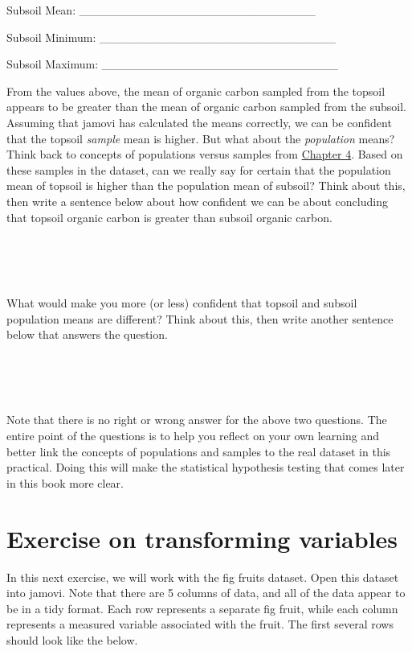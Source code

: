\documentclass[
]{scrbook}
\begin{document}
Subsoil Mean: \_\_\_\_\_\_\_\_\_\_\_\_\_\_\_\_\_\_\_\_\_\_\_\_\_\_\_\_

Subsoil Minimum: \_\_\_\_\_\_\_\_\_\_\_\_\_\_\_\_\_\_\_\_\_\_\_\_\_\_\_\_

Subsoil Maximum: \_\_\_\_\_\_\_\_\_\_\_\_\_\_\_\_\_\_\_\_\_\_\_\_\_\_\_\_

From the values above, the mean of organic carbon sampled from the topsoil appears to be greater than the mean of organic carbon sampled from the subsoil.
Assuming that jamovi has calculated the means correctly, we can be confident that the topsoil \emph{sample} mean is higher.
But what about the \emph{population} means?
Think back to concepts of populations versus samples from \protect\hyperlink{Chapter_4}{Chapter 4}.
Based on these samples in the dataset, can we really say for certain that the population mean of topsoil is higher than the population mean of subsoil?
Think about this, then write a sentence below about how confident we can be about concluding that topsoil organic carbon is greater than subsoil organic carbon.

\begin{verbatim}




\end{verbatim}

What would make you more (or less) confident that topsoil and subsoil population means are different?
Think about this, then write another sentence below that answers the question.

\begin{verbatim}




\end{verbatim}

Note that there is no right or wrong answer for the above two questions.
The entire point of the questions is to help you reflect on your own learning and better link the concepts of populations and samples to the real dataset in this practical.
Doing this will make the statistical hypothesis testing that comes later in this book more clear.

\hypertarget{transforming_variables_02}{%
\section{Exercise on transforming variables}\label{transforming_variables_02}}

In this next exercise, we will work with the fig fruits dataset.
Open this dataset into jamovi.
Note that there are 5 columns of data, and all of the data appear to be in a tidy format.
Each row represents a separate fig fruit, while each column represents a measured variable associated with the fruit.
The first several rows should look like the below.
\end{document}
